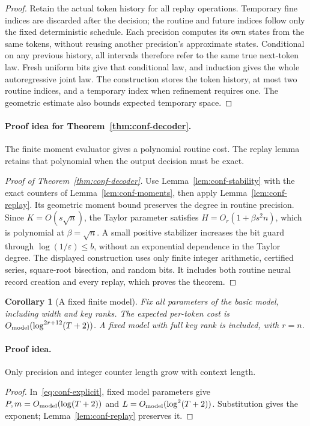 \documentclass[11pt]{article}
\newtheorem{corollary}[theorem]{Corollary}
\theoremstyle{definition}\newtheorem{definition}[theorem]{Definition}
\theoremstyle{remark}\newtheorem{remark}[theorem]{Remark}
\numberwithin{equation}{section}
\begin{document}
\begin{proof}
Retain the actual token history for all replay operations. Temporary
fine indices are discarded after the decision; the routine and future
indices follow only the fixed deterministic schedule. Each precision
computes its own states from the same tokens, without reusing another
precision's approximate states. Conditional on any previous history,
all intervals therefore refer to the same true next-token law. Fresh
uniform bits give that conditional law, and induction gives the whole
autoregressive joint law. The construction stores the token history,
at most two routine indices, and a temporary index when refinement
requires one. The geometric estimate also bounds expected temporary
space.
\end{proof}

\paragraph{Proof idea for Theorem~\ref{thm:conf-decoder}.}
The finite moment evaluator gives a polynomial routine cost. The replay
lemma retains that polynomial when the output decision must be exact.
\begin{proof}[Proof of Theorem~\ref{thm:conf-decoder}]
Use Lemma~\ref{lem:conf-stability} with the exact counters of
Lemma~\ref{lem:conf-moments}, then apply Lemma~\ref{lem:conf-replay}.
Its geometric moment bound preserves the degree in routine precision.
Since $K=O(s\sqrt n)$, the Taylor parameter satisfies
$H=O_r(1+\beta s^2n)$, which is polynomial at $\beta=\sqrt n$.
A small positive stabilizer increases the bit guard through
$\log(1/\varepsilon)\le b$, without an exponential dependence in the
Taylor degree. The displayed construction uses only finite integer
arithmetic, certified series, square-root bisection, and random bits.
It includes both routine neural record creation and every replay, which
proves the theorem.
\end{proof}

\begin{corollary}[A fixed finite model]
\label{cor:conf-fixed-model}
Fix all parameters of the basic model, including width and key ranks.
The expected per-token cost is
$O_{\rm model}(\log^{2r+12}(T+2))$. A fixed model with full key rank
is included, with $r=n$.
\end{corollary}
\paragraph{Proof idea.}
Only precision and integer counter length grow with context length.
\begin{proof}
In~\eqref{eq:conf-explicit}, fixed model parameters give
$P,m=O_{\rm model}(\log(T+2))$ and
$L=O_{\rm model}(\log^2(T+2))$. Substitution gives the exponent;
Lemma~\ref{lem:conf-replay} preserves it.
\end{proof}
\end{document}
